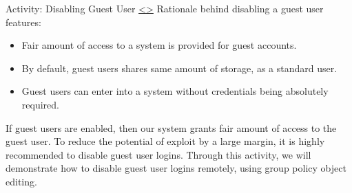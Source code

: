 \documentclass[12pt]{extarticle}
\newenvironment{instructionblock}{\Large\bgroup}{\egroup}
\begin{document}


\pagebreak
\begin{slide}{ Activity: Disabling Guest User }{\hyperref[slide 14]{\textless}\hyperref[slide 16]{\textgreater}}
\vskip 5pt
\begin{instructionblock}
	Rationale behind disabling a guest user features:
	\begin{itemize}  
		\item Fair amount of access to a system is provided for guest accounts.
		\item By default, guest users shares same amount of storage, as a standard user.
		\item Guest users can enter into a system without credentials being absolutely required. 
	\end{itemize}
\end{instructionblock}
\end{slide}

\vspace{2mm}
\noindent
If guest users are enabled, then our system grants fair amount of access to the guest user. To reduce the potential of exploit by a large margin, it is highly recommended to disable guest user logins. Through this activity, we will demonstrate how to disable guest user logins remotely, using group policy object editing.
\end{document}

